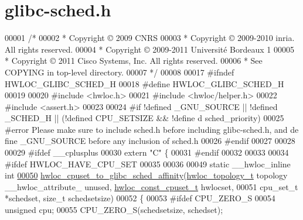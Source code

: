 \hypertarget{a00030_source}{
\section{glibc-\/sched.h}
}

\begin{DoxyCode}
00001 \textcolor{comment}{/*}
00002 \textcolor{comment}{ * Copyright © 2009 CNRS}
00003 \textcolor{comment}{ * Copyright © 2009-2010 inria.  All rights reserved.}
00004 \textcolor{comment}{ * Copyright © 2009-2011 Université Bordeaux 1}
00005 \textcolor{comment}{ * Copyright © 2011 Cisco Systems, Inc.  All rights reserved.}
00006 \textcolor{comment}{ * See COPYING in top-level directory.}
00007 \textcolor{comment}{ */}
00008 
00017 \textcolor{preprocessor}{#ifndef HWLOC\_GLIBC\_SCHED\_H}
00018 \textcolor{preprocessor}{}\textcolor{preprocessor}{#define HWLOC\_GLIBC\_SCHED\_H}
00019 \textcolor{preprocessor}{}
00020 \textcolor{preprocessor}{#include <hwloc.h>}
00021 \textcolor{preprocessor}{#include <hwloc/helper.h>}
00022 \textcolor{preprocessor}{#include <assert.h>}
00023 
00024 \textcolor{preprocessor}{#if !defined \_GNU\_SOURCE || !defined \_SCHED\_H || (!defined CPU\_SETSIZE && !define
      d sched\_priority)}
00025 \textcolor{preprocessor}{}\textcolor{preprocessor}{#error Please make sure to include sched.h before including glibc-sched.h, and de
      fine \_GNU\_SOURCE before any inclusion of sched.h}
00026 \textcolor{preprocessor}{}\textcolor{preprocessor}{#endif}
00027 \textcolor{preprocessor}{}
00028 
00029 \textcolor{preprocessor}{#ifdef \_\_cplusplus}
00030 \textcolor{preprocessor}{}\textcolor{keyword}{extern} \textcolor{stringliteral}{"C"} \{
00031 \textcolor{preprocessor}{#endif}
00032 \textcolor{preprocessor}{}
00033 
00034 \textcolor{preprocessor}{#ifdef HWLOC\_HAVE\_CPU\_SET}
00035 \textcolor{preprocessor}{}
00036 
00049 \textcolor{keyword}{static} \_\_hwloc\_inline \textcolor{keywordtype}{int}
\hypertarget{a00030_source_l00050}{}\hyperlink{a00066_ga39454e6013441d32e58ef4c4fcba7e4b}{00050} \hyperlink{a00066_ga39454e6013441d32e58ef4c4fcba7e4b}{hwloc_cpuset_to_glibc_sched_affinity}(\hyperlink{a00039_ga9d1e76ee15a7dee158b786c30b6a6e38}{hwloc_topology_t} topology \_\_hwloc\_attribute\_
      unused, \hyperlink{a00040_ga1f784433e9b606261f62d1134f6a3b25}{hwloc_const_cpuset_t} hwlocset,
00051                                     cpu\_set\_t *schedset, \textcolor{keywordtype}{size\_t} schedsetsize)
00052 \{
00053 \textcolor{preprocessor}{#ifdef CPU\_ZERO\_S}
00054 \textcolor{preprocessor}{}  \textcolor{keywordtype}{unsigned} cpu;
00055   CPU\_ZERO\_S(schedsetsize, schedset);

\end{DoxyCode}
